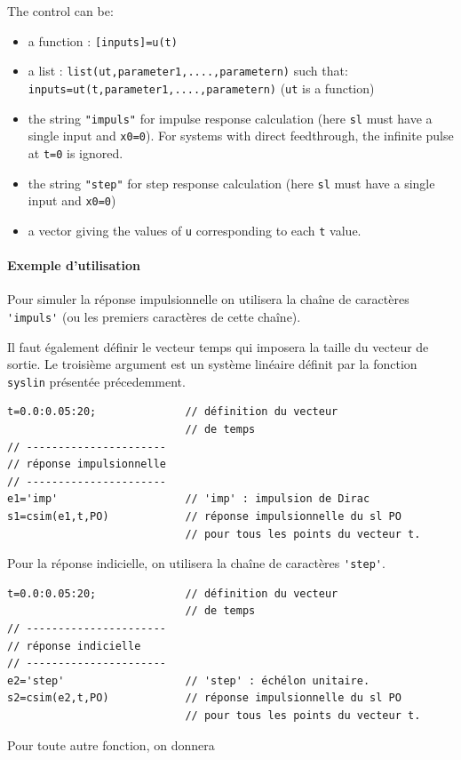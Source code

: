 \begin{doc}
\begin{itemize}
    The control can be:
    \begin{itemize}
        \item a function : \verb?[inputs]=u(t)?
        \item a list : \verb?list(ut,parameter1,....,parametern)? such that:
              \verb?inputs=ut(t,parameter1,....,parametern)? 
    (\verb?ut? is a function)
        \item the string \verb?"impuls"? for impulse response calculation 
              (here \verb?sl? must have a single input and \verb?x0=0?). 
              For systems with direct feedthrough, the infinite pulse at 
              \verb?t=0? is ignored.
        \item the string \verb?"step"? for step response calculation (here 
              \verb?sl? must have a single input and \verb?x0=0?)
        \item a vector giving the values of \verb?u? corresponding to each 
              \verb?t? value.
\end{itemize}
\end{itemize}
\end{doc}

\paragraph{Exemple d'utilisation}

Pour simuler la réponse impulsionnelle on utilisera la chaîne de caractères 
\verb?'impuls'? (ou les premiers caractères de cette chaîne). 

Il faut également définir le vecteur temps qui imposera la 
taille du vecteur de sortie. Le troisième argument est un système linéaire
définit par la fonction \verb?syslin? présentée précedemment. 
\begin{code}
\begin{verbatim}
t=0.0:0.05:20;              // définition du vecteur 
                            // de temps
// ----------------------
// réponse impulsionnelle
// ----------------------
e1='imp'                    // 'imp' : impulsion de Dirac
s1=csim(e1,t,PO)            // réponse impulsionnelle du sl PO
                            // pour tous les points du vecteur t.

\end{verbatim}
\end{code}
Pour la réponse indicielle, on utilisera la chaîne de caractères \verb?'step'?.
\begin{code}
\begin{verbatim}
t=0.0:0.05:20;              // définition du vecteur 
                            // de temps
// ----------------------
// réponse indicielle 
// ----------------------
e2='step'                   // 'step' : échélon unitaire.
s2=csim(e2,t,PO)            // réponse impulsionnelle du sl PO
                            // pour tous les points du vecteur t.

\end{verbatim}
\end{code}
Pour toute autre fonction, on donnera 

